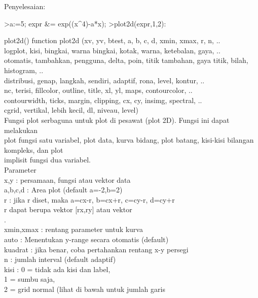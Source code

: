 \documentclass[a4paper,10pt]{article}
\begin{document}
\begin{eulernotebook}
\begin{eulercomment}
\begin{eulercomment}
\begin{eulercomment}
\begin{eulercomment}
\begin{eulercomment}
\begin{eulercomment}
\begin{eulercomment}
\begin{eulercomment}
\begin{eulercomment}
\begin{eulercomment}
\begin{eulercomment}
Penyelesaian:
\end{eulercomment}
\begin{eulerprompt}
>a:=5; expr &= exp((x^4)-a*x);
>plot2d(expr,1,2):
\end{eulerprompt}
\begin{eulercomment}
\end{eulercomment}
\begin{eulercomment}
plot2d() function plot2d (xv, yv, btest, a, b, c, d, xmin, xmax, r, n,
..\\
logplot, kisi, bingkai, warna bingkai, kotak, warna, ketebalan, gaya,
..\\
otomatis, tambahkan, pengguna, delta, poin, titik tambahan, gaya
titik, bilah, histogram, ..\\
distribusi, genap, langkah, sendiri, adaptif, rona, level, kontur, ..\\
nc, terisi, fillcolor, outline, title, xl, yl, maps, contourcolor, ..\\
contourwidth, ticks, margin, clipping, cx, cy, insimg, spectral, ..\\
cgrid, vertikal, lebih kecil, dl, niveau, level)\\
Fungsi plot serbaguna untuk plot di pesawat (plot 2D). Fungsi ini
dapat melakukan\\
plot fungsi satu variabel, plot data, kurva bidang, plot batang,
kisi-kisi bilangan kompleks, dan plot\\
implisit fungsi dua variabel.\\
Parameter\\
x,y : persamaan, fungsi atau vektor data\\
a,b,c,d : Area plot (default a=-2,b=2)\\
r : jika r diset, maka a=cx-r, b=cx+r, c=cy-r, d=cy+r\\
r dapat berupa vektor [rx,ry] atau vektor\\
[rx1,rx2,ry1,ry2].\\
xmin,xmax : rentang parameter untuk kurva\\
auto : Menentukan y-range secara otomatis (default)\\
kuadrat : jika benar, coba pertahankan rentang x-y persegi\\
n : jumlah interval (default adaptif)\\
kisi : 0 = tidak ada kisi dan label,\\
1 = sumbu saja,\\
2 = grid normal (lihat di bawah untuk jumlah garis\\

\end{eulercomment}
\end{eulercomment}
\end{eulercomment}
\end{eulercomment}
\end{eulercomment}
\end{eulercomment}
\end{eulercomment}
\end{eulercomment}
\end{eulercomment}
\end{eulercomment}
\end{eulercomment}
\end{eulernotebook}
\end{document}
